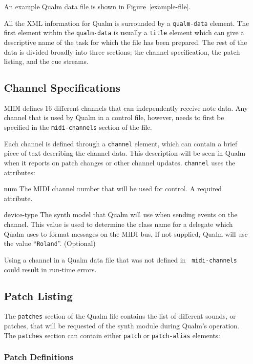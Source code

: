 \documentclass{article}
\newcommand{\q}{{\textsf{Qualm}}\xspace}
\newcommand{\attrlabel}[1]{\mbox{{\ttfamily\itshape #1}}~~--}
\newenvironment{attributes}
  {\list{}{\let\makelabel\attrlabel}}
  {\endlist}
\begin{document}
An example \q data file is shown in Figure~\ref{example-file}.

All the XML information for \q is surrounded by a {\tt qualm-data}
element.  The first element within the {\tt qualm-data} is usually a
{\tt title} element which can give a descriptive name of the task for
which the file has been prepared.  The rest of the data is divided
broadly into three sections; the channel specification, the patch
listing, and the cue streams.

\subsection{Channel Specifications}

MIDI defines 16 different channels that can independently receive note
data.  Any channel that is used by \q in a control file, however,
needs to first be specified in the {\tt midi-channels} section of the file.

Each channel is defined through a {\tt channel} element, which can
contain a brief piece of text describing the channel data.  This
description will be seen in \q when it reports on patch changes or
other channel updates.  {\tt channel} uses the attributes:

\begin{attributes}
 \item[num] The MIDI channel number that will be used for control.  A
   required attribute.
 \item[device-type] The synth model that \q will use when sending
   events on the channel.  This value is used to determine the class
   name for a delegate which \q uses to format messages on the MIDI
   bus.  If not supplied, \q will use the value ``{\tt Roland}''.
   (Optional)
\end{attributes}

Using a channel in a \q data file that was not defined in {\tt
  midi-channels} could result in run-time errors.


\subsection{Patch Listing}

The {\tt patches} section of the \q file contains the list of
different sounds, or patches, that will be requested of the synth
module during \q's operation.  The {\tt patches} section can
contain either {\tt patch} or {\tt patch-alias} elements:

\subsubsection{Patch Definitions}
\end{document}
